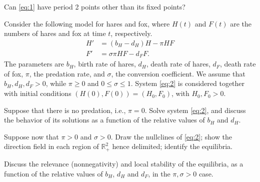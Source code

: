 \documentclass[12pt]{article}
\theoremstyle{plain}
\begin{document}
 Can \eqref{eq:1} have period 2 points other than its fixed points?


\vskip1cm
Consider the following model for hares and fox, where $H(t)$ and $F(t)$ are the numbers of hares and fox at time $t$, respectively.
\begin{equation}\label{eq:2}
\begin{aligned}
H' &= (b_H-d_H)H - \pi HF \\
F' &= \sigma\pi HF -d_FF.
\end{aligned}
\end{equation}
The parameters are $b_H$, birth rate of hares, $d_H$, death rate of hares, $d_F$, death rate of fox, $\pi$, the predation rate, and $\sigma$, the conversion coefficient. We assume that $b_H,d_H,d_F>0$, while $\pi\geq 0$ and 
$0\leq\sigma\leq 1$. System \eqref{eq:2} is considered together with initial conditions $(H(0),F(0))=(H_0,F_0)$, with $H_0,F_0>0$.

Suppose that there is no predation, i.e., $\pi=0$. Solve system \eqref{eq:2}, and discuss the behavior of its solutions as a function of the relative values of $b_H$ and $d_H$.

Suppose now that $\pi>0$ and $\sigma>0$. Draw the nullclines of \eqref{eq:2}; show the direction field in each region of $\mathbb{R}_+^2$ hence delimited; identify the equilibria.

Discuss the relevance (nonnegativity) and local stability of the equilibria, as a function of the relative values of $b_H$, $d_H$ and $d_F$, in the $\pi,\sigma>0$ case.
\end{document}
